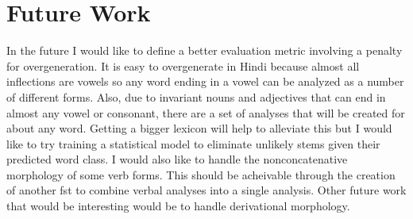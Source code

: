 \documentclass[11pt,letterpaper]{article}
\begin{document}
\section{Future Work}
In the future I would like to define a better evaluation metric involving a penalty for overgeneration. It is easy to overgenerate in Hindi because almost all inflections are vowels so any word ending in a vowel can be analyzed as a number of different forms. Also, due to invariant nouns and adjectives that can end in almost any vowel or consonant, there are a set of analyses that will be created for about any word. Getting a bigger lexicon will help to alleviate this but I would like to try training a statistical model to eliminate unlikely stems given their predicted word class.
I would also like to handle the nonconcatenative morphology of some verb forms. This should be acheivable through the creation of another fst to combine verbal analyses into a single analysis.
Other future work that would be interesting would be to handle derivational morphology.



\label{lastpage}
\end{document}
